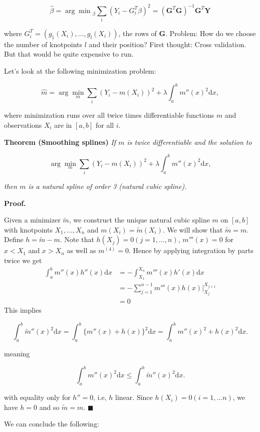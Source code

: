 \documentclass[
]{book}
\begin{document}
\[
\hat \beta = {\arg \min }_\beta \sum_i (Y_i - { G_i^T}\beta )^2= (\mathbf G^T\mathbf  G)^{-1}\mathbf  G^T\mathbf Y
\]

where \(G_i^T=(g_1(X_i), \dots, g_l(X_i))\), the rows of \(\mathbf G\). Problem: How do we choose the number of knotpoints \(l\) and their position? First thought: Cross validation. But that would be quite expensive to run.

Let's look at the following minimization problem:

\[
\hat m= \arg\min_{m} \sum_i (Y_i-m(X_i))^2+\lambda\int_a^b m''(x)^2\mathrm dx,
\]

where minimization runs over all twice times differentiable functions \(m\) and observations \(X_i\) are in \([a,b]\) for all \(i\).

\textbf{Theorem (Smoothing splines)} \emph{If \(m\) is twice differentiable and the solution to }

\[
\arg\min_{m} \sum_i (Y_i-m(X_i))^2+\lambda\int_a^b m''(x)^2\mathrm dx,
\]

\emph{then \(m\) is a natural spline of order 3 (natural cubic spline).}

\textbf{Proof.}

Given a minimizer \(\tilde m\), we construct the unique natural cubic spline \(m\) on \([a,b]\) with knotpoints \(X_1,\dots, X_n\) and \(m(X_i)=\tilde m(X_i)\). We will show that \(\tilde m=m\). Define \(h=\tilde m-m\). Note that \(h(X_j)=0 (j=1,\dots,n)\), \(m'''(x)=0\) for \(x<X_1\) and \(x>X_n\) as well as \(m^{(4)}=0\). Hence by applying integration by parts twice we get
\begin{align*}
\int_a^b m''(x)h''(x)\mathrm dx
&= -\int_{X_1}^{X_n}m'''(x)h'(x)\mathrm dx \\
&= -\sum_{j=1}^{n-1}m'''(x)h(x)\Big|_{X_j}^{X_{j+1}} \\
&=0
\end{align*}
This implies

\[
\int_a^b \tilde m''(x)^2\mathrm dx= \int_a^b \{m''(x)+h(x)\}^2\mathrm dx=\int_a^b m''(x)^2+h(x)^2\mathrm dx.
\]

meaning

\[
\int_a^b m''(x)^2\mathrm dx \leq \int_a^b \tilde m''(x)^2\mathrm dx.
\]

with equality only for \(h''=0\), i.e, \(h\) linear. Since \(h(X_i)=0 (i=1,\dots n)\), we have \(h=0\) and so \(\tilde m=m\). \(\blacksquare\)

We can conclude the following:
\end{document}
